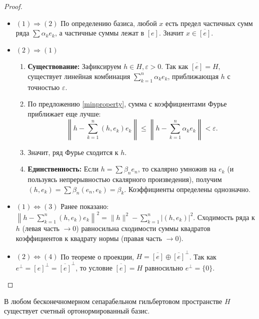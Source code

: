 \begin{proof}
	\begin{itemize}
		\item $(1) \Rightarrow (2)$
		По определению базиса, любой $x$ есть предел частичных сумм ряда $\sum \alpha_k e_k$, а частичные суммы лежат в $[e]$. Значит $x \in \overline{[e]}$.
		
		\item $(2) \Rightarrow (1)$
		\begin{enumerate}
			\item \textbf{Существование:} Зафиксируем $h \in H, \varepsilon > 0$. Так как $\overline{[e]} = H$, существует линейная комбинация $\sum_{k=1}^n \alpha_k e_k$, приближающая $h$ с точностью $\varepsilon$.
			\item По предложению \ref{minproperty}, сумма с коэффициентами Фурье приближает еще лучше:
			\[ \left\|h - \sum_{k=1}^n (h, e_k)e_k\right\| \leqslant \left\|h - \sum_{k=1}^n \alpha_k e_k\right\| < \varepsilon. \]
			\item Значит, ряд Фурье сходится к $h$.
			\item \textbf{Единственность:} Если $h = \sum \beta_n e_n$, то скалярно умножив на $e_k$ (и пользуясь непрерывностью скалярного произведения), получим $(h, e_k) = \sum \beta_n (e_n, e_k) = \beta_k$. Коэффициенты определены однозначно.
		\end{enumerate}
		
		\item $(1) \Leftrightarrow (3)$
		Ранее показано: $\left\|h - \sum_{k=1}^n (h, e_k)e_k\right\|^2 = \|h\|^2 - \sum_{k=1}^n |(h, e_k)|^2$.
		Сходимость ряда к $h$ (левая часть $\to 0$) равносильна сходимости суммы квадратов коэффициентов к квадрату нормы (правая часть $\to 0$).
		
		\item $(2) \Leftrightarrow (4)$
		По теореме о проекции, $H = \overline{[e]} \oplus \overline{[e]}^\perp$.
		Так как $e^\perp = [e]^\perp = \overline{[e]}^\perp$, то условие $\overline{[e]} = H$ равносильно $e^\perp = \{0\}$.
	\end{itemize}
\end{proof}

\begin{corollary}
	В любом бесконечномерном сепарабельном гильбертовом пространстве $H$ существует счетный ортонормированный базис.
\end{corollary}

